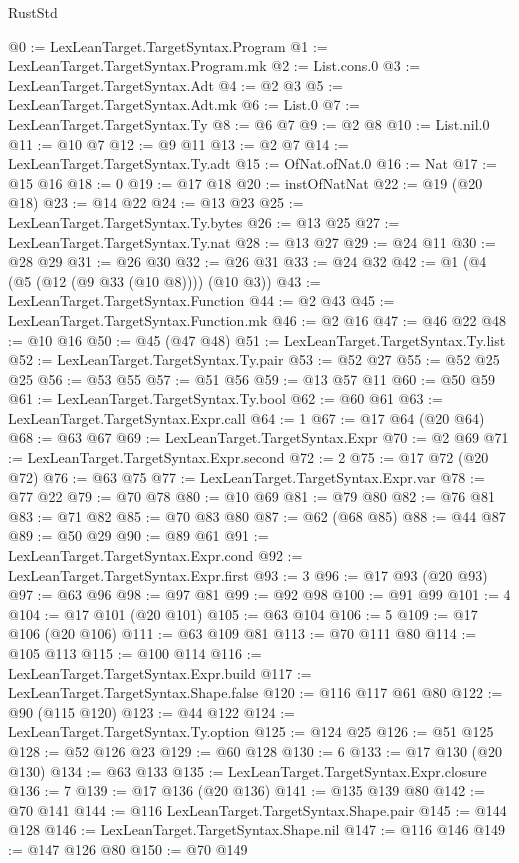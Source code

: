 \begin{lexlean}{RustStd}
\begin{coremodule}
@0 := LexLeanTarget.TargetSyntax.Program
@1 := LexLeanTarget.TargetSyntax.Program.mk
@2 := List.cons.{0}
@3 := LexLeanTarget.TargetSyntax.Adt
@4 := @2 @3
@5 := LexLeanTarget.TargetSyntax.Adt.mk
@6 := List.{0}
@7 := LexLeanTarget.TargetSyntax.Ty
@8 := @6 @7
@9 := @2 @8
@10 := List.nil.{0}
@11 := @10 @7
@12 := @9 @11
@13 := @2 @7
@14 := LexLeanTarget.TargetSyntax.Ty.adt
@15 := OfNat.ofNat.{0}
@16 := Nat
@17 := @15 @16
@18 := 0
@19 := @17 @18
@20 := instOfNatNat
@22 := @19 (@20 @18)
@23 := @14 @22
@24 := @13 @23
@25 := LexLeanTarget.TargetSyntax.Ty.bytes
@26 := @13 @25
@27 := LexLeanTarget.TargetSyntax.Ty.nat
@28 := @13 @27
@29 := @24 @11
@30 := @28 @29
@31 := @26 @30
@32 := @26 @31
@33 := @24 @32
@42 := @1 (@4 (@5 (@12 (@9 @33 (@10 @8)))) (@10 @3))
@43 := LexLeanTarget.TargetSyntax.Function
@44 := @2 @43
@45 := LexLeanTarget.TargetSyntax.Function.mk
@46 := @2 @16
@47 := @46 @22
@48 := @10 @16
@50 := @45 (@47 @48)
@51 := LexLeanTarget.TargetSyntax.Ty.list
@52 := LexLeanTarget.TargetSyntax.Ty.pair
@53 := @52 @27
@55 := @52 @25 @25
@56 := @53 @55
@57 := @51 @56
@59 := @13 @57 @11
@60 := @50 @59
@61 := LexLeanTarget.TargetSyntax.Ty.bool
@62 := @60 @61
@63 := LexLeanTarget.TargetSyntax.Expr.call
@64 := 1
@67 := @17 @64 (@20 @64)
@68 := @63 @67
@69 := LexLeanTarget.TargetSyntax.Expr
@70 := @2 @69
@71 := LexLeanTarget.TargetSyntax.Expr.second
@72 := 2
@75 := @17 @72 (@20 @72)
@76 := @63 @75
@77 := LexLeanTarget.TargetSyntax.Expr.var
@78 := @77 @22
@79 := @70 @78
@80 := @10 @69
@81 := @79 @80
@82 := @76 @81
@83 := @71 @82
@85 := @70 @83 @80
@87 := @62 (@68 @85)
@88 := @44 @87
@89 := @50 @29
@90 := @89 @61
@91 := LexLeanTarget.TargetSyntax.Expr.cond
@92 := LexLeanTarget.TargetSyntax.Expr.first
@93 := 3
@96 := @17 @93 (@20 @93)
@97 := @63 @96
@98 := @97 @81
@99 := @92 @98
@100 := @91 @99
@101 := 4
@104 := @17 @101 (@20 @101)
@105 := @63 @104
@106 := 5
@109 := @17 @106 (@20 @106)
@111 := @63 @109 @81
@113 := @70 @111 @80
@114 := @105 @113
@115 := @100 @114
@116 := LexLeanTarget.TargetSyntax.Expr.build
@117 := LexLeanTarget.TargetSyntax.Shape.false
@120 := @116 @117 @61 @80
@122 := @90 (@115 @120)
@123 := @44 @122
@124 := LexLeanTarget.TargetSyntax.Ty.option
@125 := @124 @25
@126 := @51 @125
@128 := @52 @126 @23
@129 := @60 @128
@130 := 6
@133 := @17 @130 (@20 @130)
@134 := @63 @133
@135 := LexLeanTarget.TargetSyntax.Expr.closure
@136 := 7
@139 := @17 @136 (@20 @136)
@141 := @135 @139 @80
@142 := @70 @141
@144 := @116 LexLeanTarget.TargetSyntax.Shape.pair
@145 := @144 @128
@146 := LexLeanTarget.TargetSyntax.Shape.nil
@147 := @116 @146
@149 := @147 @126 @80
@150 := @70 @149

\end{coremodule}
\end{lexlean}

